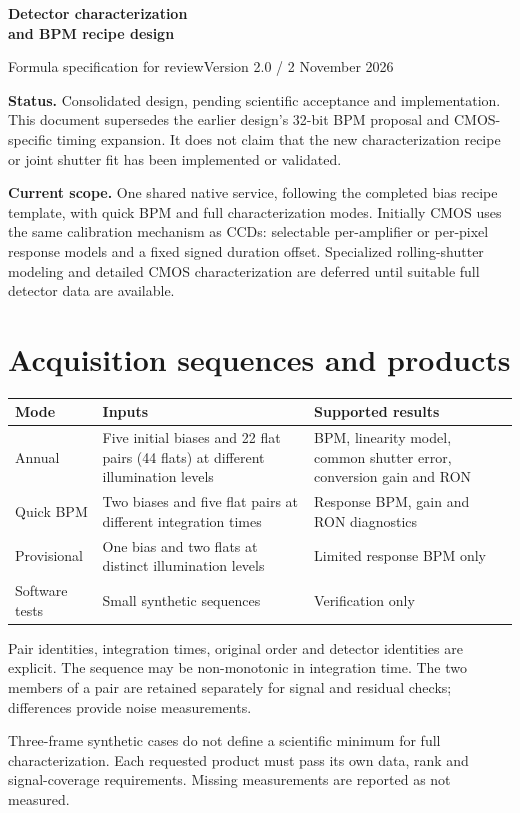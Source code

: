 \documentclass[11pt,a4paper]{article}
\newcommand{\key}[1]{\textbf{\color{ink}#1}}
\begin{document}
{\LARGE\bfseries\color{ink} Detector characterization\\[4pt] and BPM recipe design}

{\large Formula specification for review}\hfill Version 2.0 / 2 November 2026

\key{Status.} Consolidated design, pending scientific acceptance and implementation. This document supersedes the earlier design's 32-bit BPM proposal and CMOS-specific timing expansion. It does not claim that the new characterization recipe or joint shutter fit has been implemented or validated.

\key{Current scope.} One shared native service, following the completed bias recipe template, with quick BPM and full characterization modes. Initially CMOS uses the same calibration mechanism as CCDs: selectable per-amplifier or per-pixel response models and a fixed signed duration offset. Specialized rolling-shutter modeling and detailed CMOS characterization are deferred until suitable full detector data are available.

\section{Acquisition sequences and products}
\begin{tabularx}{\linewidth}{@{}p{29mm}XX@{}}\toprule
Mode & Inputs & Supported results\\\midrule
Annual & Five initial biases and 22 flat pairs (44 flats) at different illumination levels & BPM, linearity model, common shutter error, conversion gain and RON\\
Quick BPM & Two biases and five flat pairs at different integration times & Response BPM, gain and RON diagnostics\\
Provisional & One bias and two flats at distinct illumination levels & Limited response BPM only\\
Software tests & Small synthetic sequences & Verification only\\\bottomrule
\end{tabularx}

Pair identities, integration times, original order and detector identities are explicit. The sequence may be non-monotonic in integration time. The two members of a pair are retained separately for signal and residual checks; differences provide noise measurements.

Three-frame synthetic cases do not define a scientific minimum for full characterization. Each requested product must pass its own data, rank and signal-coverage requirements. Missing measurements are reported as not measured.
\end{document}
